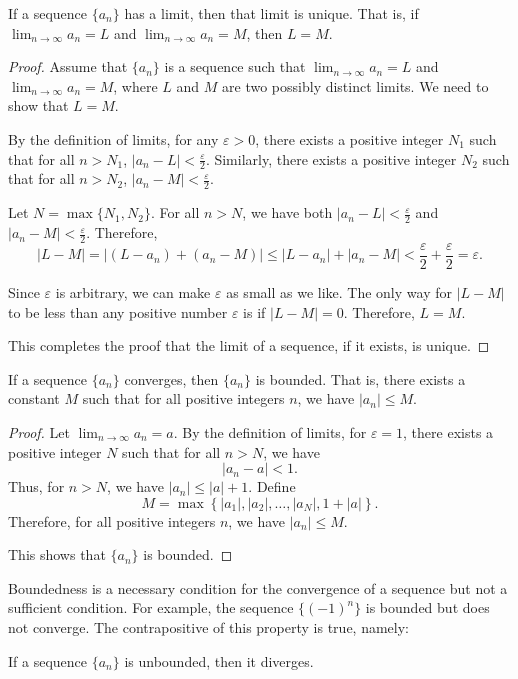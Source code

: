 \begin{theorem}
If a sequence $\{a_n\}$ has a limit, then that limit is unique. That is, if $\lim_{n \to \infty} a_n = L$ and $\lim_{n \to \infty} a_n = M$, then $L = M$.
\end{theorem}
\begin{proof}
Assume that $\{a_n\}$ is a sequence such that $\lim_{n \to \infty} a_n = L$ and $\lim_{n \to \infty} a_n = M$, where $L$ and $M$ are two possibly distinct limits. We need to show that $L = M$.

By the definition of limits, for any $\varepsilon > 0$, there exists a positive integer $N_1$ such that for all $n > N_1$, $|a_n - L| < \frac{\varepsilon}{2}$. Similarly, there exists a positive integer $N_2$ such that for all $n > N_2$, $|a_n - M| < \frac{\varepsilon}{2}$.

Let $N = \max\{N_1, N_2\}$. For all $n > N$, we have both $|a_n - L| < \frac{\varepsilon}{2}$ and $|a_n - M| < \frac{\varepsilon}{2}$. Therefore,
\[
|L - M| = |(L - a_n) + (a_n - M)| \leq |L - a_n| + |a_n - M| < \frac{\varepsilon}{2} + \frac{\varepsilon}{2} = \varepsilon.
\]

Since $\varepsilon$ is arbitrary, we can make $\varepsilon$ as small as we like. The only way for $|L - M|$ to be less than any positive number $\varepsilon$ is if $|L - M| = 0$. Therefore, $L = M$.

This completes the proof that the limit of a sequence, if it exists, is unique.
\end{proof}
%
\begin{theorem}
If a sequence $\{a_n\}$ converges, then $\{a_n\}$ is bounded. That is, there exists a constant $M$ such that for all positive integers $n$, we have $\left|a_n\right| \leq M$.
\end{theorem}
\begin{proof}
Let $\lim_{n \to \infty} a_n = a$. By the definition of limits, for $\varepsilon = 1$, there exists a positive integer $N$ such that for all $n > N$, we have
\[
\left|a_n - a\right| < 1.
\]
Thus, for $n > N$, we have $\left|a_n\right| \leq \left|a\right| + 1$. Define
\[
M = \max \left\{\left|a_1\right|, \left|a_2\right|, \ldots, \left|a_N\right|, 1 + \left|a\right|\right\}.
\]
Therefore, for all positive integers $n$, we have $\left|a_n\right| \leq M$.

This shows that $\{a_n\}$ is bounded.
\end{proof}
\begin{remark}
Boundedness is a necessary condition for the convergence of a sequence but not a sufficient condition. For example, the sequence $\{(-1)^n\}$ is bounded but does not converge. The contrapositive of this property is true, namely:

\begin{corollary}
If a sequence $\{a_n\}$ is unbounded, then it diverges.
\end{corollary}
\end{remark}

